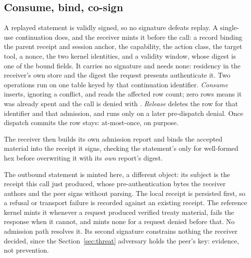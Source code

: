 

\subsection{Consume, bind, co-sign}

A replayed statement is validly signed, so no signature defeats replay. A
single-use continuation does, and the receiver mints it before the call: a
record binding the parent receipt and session anchor, the capability, the
action class, the target tool, a nonce, the two kernel identities, and a
validity window, whose digest is one of the \PSBindingFieldCount{} bound
fields. It carries no signature and needs none: residency in the receiver's own
store and the digest the request presents authenticate it.
Two operations run on one table keyed by that continuation identifier.
\emph{Consume} inserts, ignoring a conflict, and reads the affected row count;
zero rows means it was already spent and the call is denied with
.
\emph{Release} deletes the row for that identifier and that admission, and
runs only on a later pre-dispatch denial. Once dispatch commits the row stays:
at-most-once, on purpose.

The receiver then builds its own admission report and binds the accepted
material into the receipt it signs, checking the statement's
 only for well-formed hex before overwriting it
with its \emph{own} report's digest.

The outbound statement is minted here, a different object: its subject is the
receipt this call just produced, whose pre-authentication bytes the receiver
authors and the peer signs without parsing. The local receipt is persisted
first, so a refusal or transport failure is recorded against an existing
receipt. The reference kernel mints it whenever a request produced verified
treaty material, fails the response when it cannot, and mints none for a
request denied before that. No admission path resolves it. Its second signature constrains nothing the
receiver decided, since the Section~\ref{sec:threat} adversary holds the
peer's key: evidence, not prevention.
